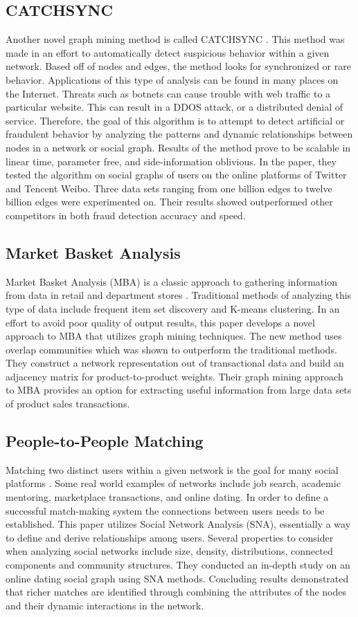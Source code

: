 \documentclass[letterpaper, 10 pt, conference]{ieeeconf}
\begin{document}
\subsection{CATCHSYNC}
Another novel graph mining method is called CATCHSYNC \cite{c4}. This method was made in an effort to automatically detect suspicious behavior within a given network. Based off of nodes and edges, the method looks for synchronized or rare behavior. Applications of this type of analysis can be found in many places on the Internet. Threats such as botnets can cause trouble with web traffic to a particular website. This can result in a DDOS attack, or a distributed denial of service. Therefore, the goal of this algorithm is to attempt to detect artificial or fraudulent behavior by analyzing the patterns and dynamic relationships between nodes in a network or social graph. Results of the method prove to be scalable in linear time, parameter free, and side-information oblivious. In the paper, they tested the algorithm on social graphs of users on the online platforms of Twitter and Tencent Weibo. Three data sets ranging from one billion edges to twelve billion edges were experimented on. Their results showed outperformed other competitors in both fraud detection accuracy and speed.

\hfill
\subsection{Market Basket Analysis}
Market Basket Analysis (MBA) is a classic approach to gathering information from data in retail and department stores \cite{c5}. Traditional methods of analyzing this type of data include frequent item set discovery and K-means clustering. In an effort to avoid poor quality of output results, this paper develops a novel approach to MBA that utilizes graph mining techniques. The new method uses overlap communities which was shown to outperform the traditional methods. They construct a network representation out of transactional data and build an adjacency matrix for product-to-product weights. Their graph mining approach to MBA provides an option for extracting useful information from large data sets of product sales transactions.

\hfill
\subsection{People-to-People Matching}
Matching two distinct users within a given network is the goal for many social platforms \cite{c6}. Some real world examples of networks include job search, academic mentoring, marketplace transactions, and online dating. In order to define a successful match-making system the connections between users needs to be established. This paper utilizes Social Network Analysis (SNA), essentially a way to define and derive relationships among users. Several properties to consider when analyzing social networks include size, density, distributions, connected components and community structures. They conducted an in-depth study on an online dating social graph using SNA methods. Concluding results demonstrated that richer matches are identified through combining the attributes of the nodes and their dynamic interactions in the network.
\end{document}
